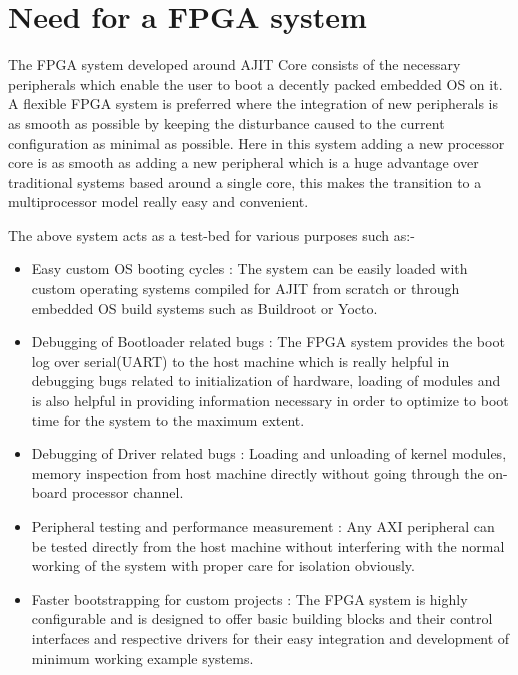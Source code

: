 \chapter{Need for a FPGA system}

The FPGA system developed around AJIT Core consists of the necessary peripherals which enable the user to boot a decently packed embedded OS
on it. A flexible FPGA system is preferred where the integration of new peripherals is as smooth as possible by keeping the disturbance
caused to the current configuration as minimal as possible. Here in this system adding a new processor core is as smooth as adding a new
peripheral which is a huge advantage over traditional systems based around a single core, this makes the transition to a multiprocessor
model really easy and convenient.

The above system acts as a test-bed for various purposes such as:-

\begin{itemize}

\item Easy custom OS booting cycles : The system can be easily loaded with custom operating systems compiled for AJIT from scratch or through
embedded OS build systems such as Buildroot or Yocto.


\item Debugging of Bootloader related bugs : The FPGA system provides the boot log over serial(UART) to the host machine which is really
helpful in debugging bugs related to initialization of hardware, loading of modules and is also helpful in providing information necessary
in order to optimize to boot time for the system to the maximum extent.

\item Debugging of Driver related bugs : Loading and unloading of kernel modules, memory inspection from host machine directly without going
through the on-board processor channel.

\item Peripheral testing and performance measurement : Any AXI peripheral can be tested directly from the host machine without interfering
with the normal working of the system with proper care for isolation obviously.

\item Faster bootstrapping for custom projects : The FPGA system is highly configurable and is designed to offer basic building blocks and
their control interfaces and respective drivers for their easy integration and development of minimum working example systems. 

\end{itemize}
